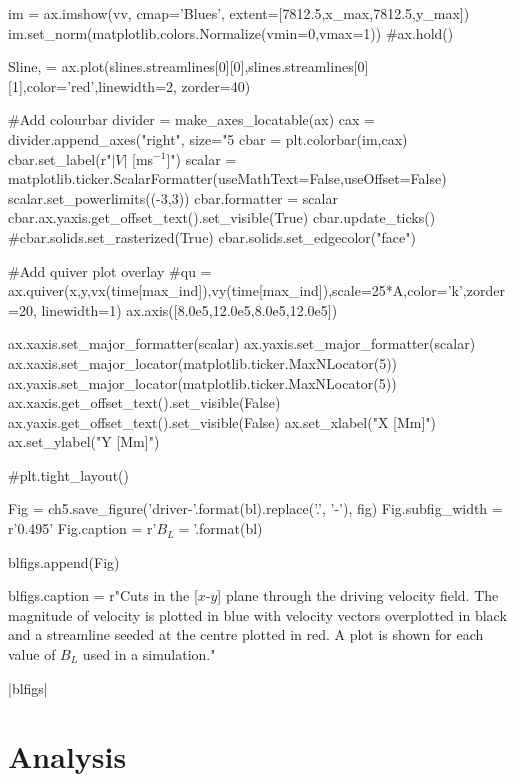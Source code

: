 \begin{pycode}[chapter5]
    im = ax.imshow(vv, cmap='Blues', extent=[7812.5,x_max,7812.5,y_max])
    im.set_norm(matplotlib.colors.Normalize(vmin=0,vmax=1))
    #ax.hold()
    
    Sline, = ax.plot(slines.streamlines[0][0],slines.streamlines[0][1],color='red',linewidth=2, zorder=40)
    
    #Add colourbar
    divider = make_axes_locatable(ax)
    cax = divider.append_axes("right", size="5%
    cbar = plt.colorbar(im,cax)
    cbar.set_label(r"$|V|$ [ms$^{-1}$]")
    scalar = matplotlib.ticker.ScalarFormatter(useMathText=False,useOffset=False)
    scalar.set_powerlimits((-3,3))
    cbar.formatter = scalar
    cbar.ax.yaxis.get_offset_text().set_visible(True)
    cbar.update_ticks()
    #cbar.solids.set_rasterized(True)
    cbar.solids.set_edgecolor("face")
    
    #Add quiver plot overlay
    #qu = ax.quiver(x,y,vx(time[max_ind]),vy(time[max_ind]),scale=25*A,color='k',zorder=20, linewidth=1)
    ax.axis([8.0e5,12.0e5,8.0e5,12.0e5])
    
    ax.xaxis.set_major_formatter(scalar)
    ax.yaxis.set_major_formatter(scalar)
    ax.xaxis.set_major_locator(matplotlib.ticker.MaxNLocator(5))
    ax.yaxis.set_major_locator(matplotlib.ticker.MaxNLocator(5))
    ax.xaxis.get_offset_text().set_visible(False)
    ax.yaxis.get_offset_text().set_visible(False)
    ax.set_xlabel("X [Mm]")
    ax.set_ylabel("Y [Mm]")
    
    #plt.tight_layout()
    
    Fig = ch5.save_figure('driver-{}'.format(bl).replace('.', '-'), fig)
    Fig.subfig_width = r'0.495\columnwidth'
    Fig.caption = r'$B_L = {}$'.format(bl)
    
    blfigs.append(Fig)
   
blfigs.caption = r"Cuts in the [$x$-$y$] plane through the driving velocity field. The magnitude of velocity is plotted in blue with velocity vectors overplotted in black and a streamline seeded at the centre plotted in red. A plot is shown for each value of $B_L$ used in a simulation."

\end{pycode}

\py[chapter5]|blfigs|

\section{Analysis}\label{sec:analysis}

